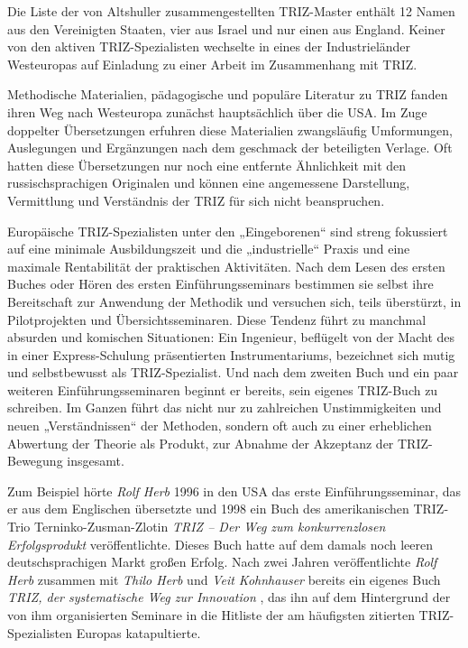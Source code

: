 \documentclass[11pt,a4paper]{article}
\begin{document}
Die Liste der von Altshuller zusammengestellten TRIZ-Master enthält 12 Namen
aus den Vereinigten Staaten, vier aus Israel und nur einen aus England. Keiner
von den aktiven TRIZ-Spezialisten wechselte in eines der Industrieländer
Westeuropas auf Einladung zu einer Arbeit im Zusammenhang mit TRIZ.

Methodische Materialien, pädagogische und populäre Literatur zu TRIZ fanden
ihren Weg nach Westeuropa zunächst hauptsächlich über die USA. Im Zuge
doppelter Übersetzungen erfuhren diese Materialien zwangsläufig Umformungen,
Auslegungen und Ergänzungen nach dem geschmack der beteiligten Verlage. Oft
hatten diese Übersetzungen nur noch eine entfernte Ähnlichkeit mit den
russischsprachigen Originalen und können eine angemessene Darstellung,
Vermittlung und Verständnis der TRIZ für sich nicht beanspruchen. 

Europäische TRIZ-Spezialisten unter den „Eingeborenen“ sind streng fokussiert
auf eine minimale Ausbildungszeit und die „industrielle“ Praxis und eine
maximale Rentabilität der praktischen Aktivitäten. Nach dem Lesen des ersten
Buches oder Hören des ersten Einführungsseminars bestimmen sie selbst ihre
Bereitschaft zur Anwendung der Methodik und versuchen sich, teils überstürzt,
in Pilotprojekten und Übersichtsseminaren. Diese Tendenz führt zu manchmal
absurden und komischen Situationen: Ein Ingenieur, beflügelt von der Macht des
in einer Express-Schulung präsentierten Instrumentariums, bezeichnet sich
mutig und selbstbewusst als TRIZ-Spezialist. Und nach dem zweiten Buch und ein
paar weiteren Einführungsseminaren beginnt er bereits, sein eigenes TRIZ-Buch
zu schreiben. Im Ganzen führt das nicht nur zu zahlreichen Unstimmigkeiten und
neuen „Verständnissen“ der Methoden, sondern oft auch zu einer erheblichen
Abwertung der Theorie als Produkt, zur Abnahme der Akzeptanz der TRIZ-Bewegung
insgesamt.

Zum Beispiel hörte \emph{Rolf Herb} 1996 in den USA das erste
Einführungsseminar, das er aus dem Englischen übersetzte und 1998 ein Buch des
amerikanischen TRIZ-Trio Terninko-Zusman-Zlotin \emph{TRIZ -- Der Weg zum
  konkurrenzlosen Erfolgsprodukt} \cite{Terninko1998} veröffentlichte.  Dieses
Buch hatte auf dem damals noch leeren deutschsprachigen Markt großen Erfolg.
Nach zwei Jahren veröffentlichte \emph{Rolf Herb} zusammen mit \emph{Thilo
  Herb} und \emph{Veit Kohnhauser} bereits ein eigenes Buch \emph{TRIZ, der
  systematische Weg zur Innovation} \cite{Herb2000}, das ihn auf dem
Hintergrund der von ihm organisierten Seminare in die Hitliste der am
häufigsten zitierten TRIZ-Spezialisten Europas katapultierte.
\end{document}
